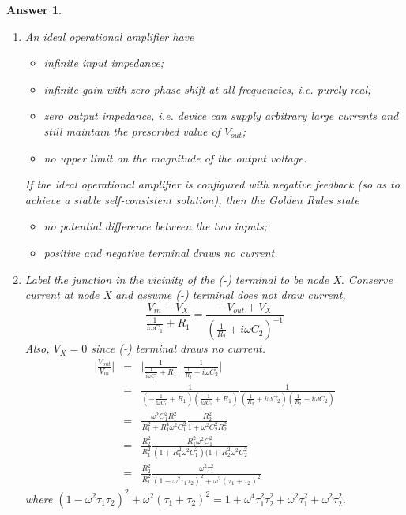 \documentclass[a4paper]{article}
\newtheorem{ans}{Answer}[subsection]
\theoremstyle{new}
\begin{document}
\begin{ans}\leavevmode
\begin{enumerate}[label=(\roman*)]
\item An ideal operational amplifier have
\begin{itemize}
    \item infinite input impedance;
    \item infinite gain with zero phase shift at all frequencies, i.e. purely real;
    \item zero output impedance, i.e. device can supply arbitrary large currents and still maintain the prescribed value of $V_{out}$;
    \item no upper limit on the magnitude of the output voltage.
\end{itemize}
If the ideal operational amplifier is configured with negative feedback (so as to achieve a stable self-consistent solution), then the Golden Rules state
\begin{itemize}
    \item no potential difference between the two inputs;
    \item positive and negative terminal draws no current.
\end{itemize}
\newpage
\item Label the junction in the vicinity of the (-) terminal to be node X. Conserve current at node X and assume (-) terminal does not draw current,
$$\frac{V_{in}-V_X}{\frac{1}{i\omega C_1}+R_1}=\frac{-V_{out}+V_X}{(\frac{1}{R_2}+i\omega C_2)^{-1}}$$
Also, $V_X=0$ since (-) terminal draws no current.
\begin{eqnarray}
\bigg|\frac{V_{out}}{V_{in}}\bigg|&=&\bigg|\frac{1}{\frac{1}{i\omega C_1}+R_1}\bigg|\bigg|\frac{1}{\frac{1}{R_2}+i\omega C_2}\bigg|\nonumber\\&=&\frac{1}{(-\frac{1}{i\omega C_1}+R_1)(\frac{-1}{i\omega C_1}+R_1)}\frac{1}{(\frac{1}{R_2}+i\omega C_2)(\frac{1}{R_2}-i\omega C_2)}\nonumber\\&=&\frac{\omega^2C_1^2R_1^2}{R_1^2+R_1^4\omega^2C_1^2}\frac{R_2^2}{1+\omega^2C_2^2R_2^2}\nonumber\\&=&\frac{R_2^2}{R_1^2}\frac{R_1^2\omega^2C_1^2}{(1+R_1^2\omega^2C_1^2)(1+R_2^2\omega^2C_2^2}\nonumber\\&=&\frac{R_2^2}{R_1^2}\frac{\omega^2\tau_1^2}{(1-\omega^2\tau_1\tau_2)^2+\omega^2(\tau_1+\tau_2)^2}\nonumber
\end{eqnarray}
where $(1-\omega^2\tau_1\tau_2)^2+\omega^2(\tau_1+\tau_2)^2=1+\omega^4\tau_1^2\tau_2^2+\omega^2\tau_1^2+\omega^2\tau_2^2$.

\end{enumerate}
\end{ans}
\end{document}
